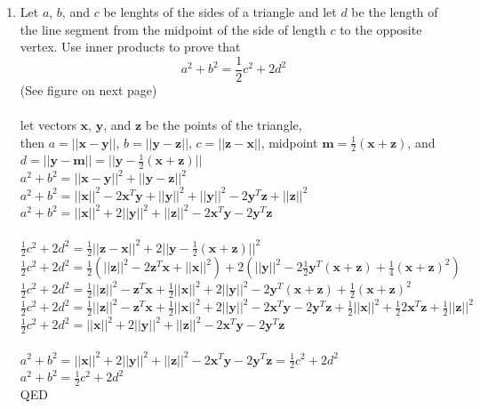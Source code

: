 \documentclass{article}
\begin{document}
{{\begin{enumerate}
\newpage\item Let $a$, $b$, and $c$ be lenghts of the sides of a triangle and let $d$ be the length of the line segment from the midpoint of the side of length $c$ to the opposite vertex. Use inner products to prove that
$$a^2+b^2=\frac{1}{2}c^2+2d^2$$
(See figure on next page)
\\
\\let vectors $\bm x$, $\bm y$, and $\bm z$ be the points of the triangle, 
\\then $a=||\bm x-\bm y||$, $b=||\bm y-\bm z||$, $c=||\bm z-\bm x||$, midpoint $\bm m=\frac{1}{2}(\bm x+\bm z)$, and 
\\$d=||\bm y-\bm m||=||\bm y-\frac{1}{2}(\bm x+\bm z)||$
\\$a^2+b^2 = ||\bm x-\bm y||^2+||\bm y-\bm z||^2$
\\$a^2+b^2 = ||\bm x||^2-2\bm x^T\bm y +||\bm y||^2+||\bm y||^2-2\bm y^T\bm z +||\bm z||^2$
\\$a^2+b^2 = ||\bm x||^2+2||\bm y||^2+||\bm z||^2-2\bm x^T\bm y -2\bm y^T\bm z$
\\
\\$\frac{1}{2}c^2+2d^2=\frac{1}{2}||\bm z - \bm x||^2 +2 ||\bm y - \frac{1}{2}(\bm x+\bm z)||^2$
\\$\frac{1}{2}c^2+2d^2=\frac{1}{2}(||\bm z||^2 -2\bm z^T\bm x + ||\bm x||^2) +2( ||\bm y||^2 -2\frac{1}{2}\bm y^T(\bm x+\bm z) + \frac{1}{4}(\bm x+\bm z)^2)$
\\$\frac{1}{2}c^2+2d^2=\frac{1}{2}||\bm z||^2 -\bm z^T\bm x + \frac{1}{2}||\bm x||^2 +2||\bm y||^2 -2\bm y^T(\bm x+\bm z) + \frac{1}{2}(\bm x+\bm z)^2$
\\$\frac{1}{2}c^2+2d^2=\frac{1}{2}||\bm z||^2 -\bm z^T\bm x + \frac{1}{2}||\bm x||^2 +2||\bm y||^2 -2\bm x^T\bm y -2\bm y^T\bm z + \frac{1}{2}||\bm x||^2 +\frac{1}{2}2\bm x^T\bm z+ \frac{1}{2}||\bm z||^2$
\\$\frac{1}{2}c^2+2d^2=||\bm x||^2 + 2||\bm y||^2 + ||\bm z||^2 - 2\bm x^T\bm y -2\bm y^T\bm z$
\\
\\$a^2+b^2 = ||\bm x||^2+2||\bm y||^2+||\bm z||^2-2\bm x^T\bm y -2\bm y^T\bm z=\frac{1}{2}c^2+2d^2$
\\$a^2+b^2 = \frac{1}{2}c^2+2d^2$
\\QED


\end{enumerate}}}
\end{document}
